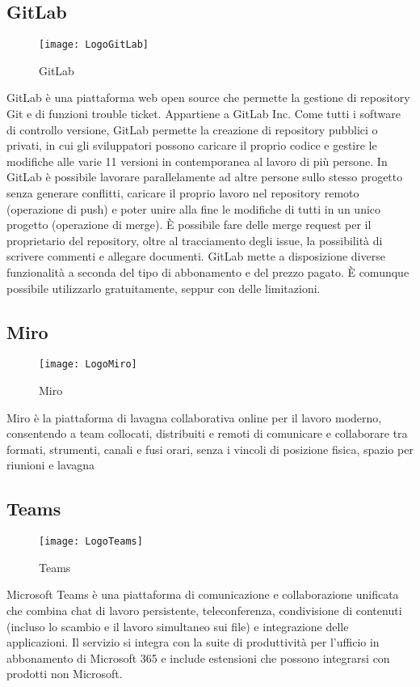 \subsection{GitLab}
\begin{figure}[htpb!]
\center
  \texttt{[image: LogoGitLab]}
  \caption{GitLab}
\end{figure}
GitLab\cite{gitl} è una piattaforma web open source che permette la gestione di repository Git e di funzioni trouble ticket. Appartiene a GitLab Inc.
Come tutti i software di controllo versione, GitLab permette la creazione di repository pubblici o privati, in cui gli sviluppatori possono caricare il proprio codice e gestire le modifiche alle varie
11
versioni in contemporanea al lavoro di più persone. In GitLab è possibile lavorare parallelamente ad altre persone sullo stesso progetto senza generare conflitti, caricare il proprio lavoro nel repository remoto (operazione di push) e poter unire alla fine le modifiche di tutti in un unico progetto (operazione di merge). È possibile fare delle merge request per il proprietario del repository, oltre al tracciamento degli issue, la possibilità di scrivere commenti e allegare documenti. GitLab mette a disposizione diverse funzionalità a seconda del tipo di abbonamento e del prezzo pagato. È comunque possibile utilizzarlo gratuitamente, seppur con delle limitazioni.

\newpage
\subsection{Miro}
\begin{figure}[htpb!]
\center
  \texttt{[image: LogoMiro]}
  \caption{Miro}
\end{figure}
Miro\cite{miro} è la piattaforma di lavagna collaborativa online per il lavoro moderno, consentendo a team collocati, distribuiti e remoti di comunicare e collaborare tra formati, strumenti, canali e fusi orari, senza i vincoli di posizione fisica, spazio per riunioni e lavagna
\subsection{Teams}
\begin{figure}[htpb!]
\center
  \texttt{[image: LogoTeams]}
  \caption{Teams}
\end{figure}
Microsoft Teams\cite{mt} è una piattaforma di comunicazione e collaborazione unificata che combina chat di lavoro persistente, teleconferenza, condivisione di contenuti (incluso lo scambio e il lavoro simultaneo sui file) e integrazione delle applicazioni. Il servizio si integra con la suite di produttività per l'ufficio in abbonamento di Microsoft 365 e include estensioni che possono integrarsi con prodotti non Microsoft.

